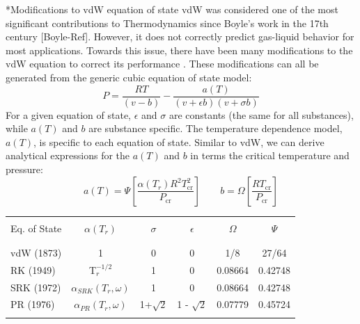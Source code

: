 \documentclass[11pt]{article}
\makeatletter
\theoremstyle{definition}
\renewcommand\subsection{\@startsection
	{subsection}{2}{0mm}
	{-0.05in}
	{0.5\baselineskip}
	{\normalfont\normalsize\bfseries}}
\makeatother
\begin{document}

\subsection*{Modifications to vdW equation of state}
vdW was considered one of the most significant contributions to Thermodynamics since Boyle's work in the 17th century [Boyle-Ref].
However, it does not correctly predict gas-liquid behavior for most applications.
Towards this issue, there have been many modifications to the vdW equation to correct its performance \cite{Valderrama2003}.
These modifications can all be generated from the generic cubic equation of state model:
\begin{equation}\label{eq:generic-model}
P = \frac{RT}{\left(v-b\right)}-\frac{a(T)}{\left(v+\epsilon b\right)\left(v+\sigma b\right)}
\end{equation}
For a given equation of state, $\epsilon$ and $\sigma$ are constants (the same for all substances), while
$a(T)$ and $b$ are substance specific. The temperature dependence model, $a(T)$, is specific to each equation of state.
Similar to vdW, we can derive analytical expressions for the $a(T)$ and $b$ in terms the critical temperature and pressure:
\begin{equation}
	a\left(T\right) = \Psi\left[\frac{\alpha\left(T_{r}\right)R^{2}T^{2}_{\mathrm{cr}}}{P_{\mathrm{cr}}}\right]\qquad
	b = \Omega\left[\frac{RT_{\mathrm{cr}}}{P_{\mathrm{cr}}}\right]
\end{equation}

\begin{center}
\begin{tabular}{lccccc}
	\hline\\
	Eq. of State & $\alpha\left(T_{r}\right)$ & $\sigma$ & $\epsilon$ & $\Omega$ & $\Psi$ \\\\
	\hline\\

	vdW (1873) & 1 & 0 & 0 & 1/8 & 27/64 \\
	RK (1949) & T$_{r}^{-1/2}$ & 1 & 0 & 0.08664 & 0.42748 \\
	SRK (1972) & $\alpha_{SRK}\left(T_{r},\omega\right)$ & 1 & 0 & 0.08664 & 0.42748 \\
	PR (1976) & $\alpha_{PR}\left(T_{r},\omega\right)$ & 1+$\sqrt{2}$ & 1 - $\sqrt{2}$ & 0.07779 & 0.45724 \\\\

	\hline

\end{tabular}
\end{center}
\end{document}
